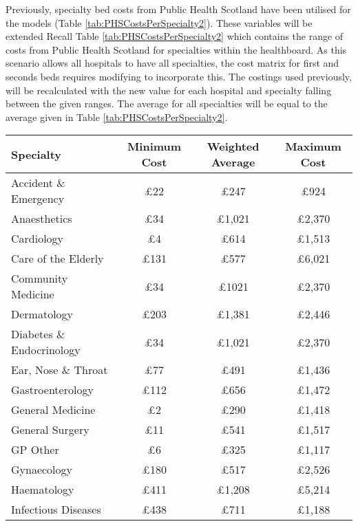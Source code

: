 \documentclass[../thesis.tex]{subfiles}
\begin{document}
Previously, specialty bed costs from Public Health Scotland have been utilised for the models (Table \ref{tab:PHSCostsPerSpecialty2}). These variables will be extended
Recall Table \ref{tab:PHSCostsPerSpecialty2} which contains the range of costs from Public Health Scotland for specialties within the healthboard. As this scenario allows all hospitals to have all specialties, the cost matrix for first and seconds beds requires modifying to incorporate this. The costings used previously, will be recalculated with the new value for each hospital and specialty falling between the given ranges. The average for all specialties will be equal to the average given in Table \ref{tab:PHSCostsPerSpecialty2}.
\begin{table}[h!]
    \centering
    \begin{tabular}{lccc}\toprule
        \textbf{Specialty} & \textbf{Minimum Cost} & \textbf{Weighted Average} & \textbf{Maximum Cost} \\\midrule
        Accident \& Emergency & $\pounds$22 &$\pounds$247 &$\pounds$924 \\
        Anaesthetics & $\pounds$34 & $\pounds$1,021 & $\pounds$2,370\\
        Cardiology & $\pounds$4 & $\pounds$614 & $\pounds$1,513 \\
        Care of the Elderly & $\pounds$131 & $\pounds$577 & $\pounds$6,021 \\
        Community Medicine & $\pounds$34 & $\pounds$1021 & $\pounds$2,370\\
        Dermatology & $\pounds$203 & $\pounds$1,381 &$\pounds$2,446 \\
        Diabetes \& Endocrinology & $\pounds$34 & $\pounds$1,021 & $\pounds$2,370\\
        Ear, Nose \& Throat & $\pounds$77 & $\pounds$491 & $\pounds$1,436 \\
        Gastroenterology & $\pounds$112 & $\pounds$656 & $\pounds$1,472 \\
        General Medicine & $\pounds$2 & $\pounds$290 & $\pounds$1,418\\
        General Surgery & $\pounds$11 & $\pounds$541 & $\pounds$1,517\\
        GP Other & $\pounds$6& $\pounds$325 & $\pounds$1,117\\
        Gynaecology & $\pounds$180 & $\pounds$517 & $\pounds$2,526 \\
        Haematology & $\pounds$411 & $\pounds$1,208 & $\pounds$5,214 \\
        Infectious Diseases & $\pounds$438 &$\pounds$711 & $\pounds$1,188 \\

\end{tabular}
\end{table}
\end{document}
